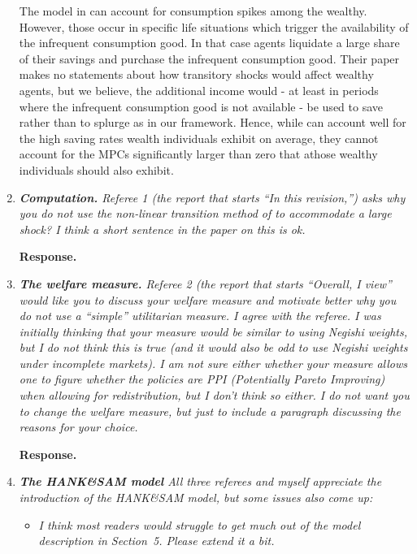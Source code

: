 \documentclass[12pt,letterpaper,english]{article}
\begin{document}
\begin{enumerate}
The model in \citet{melcangi2024stock} can account for consumption spikes among the wealthy. However, those occur in specific life situations which trigger the availability of the infrequent consumption good. In that case agents liquidate a large share of their savings and purchase the infrequent consumption good. Their paper makes no statements about how transitory shocks would affect wealthy agents, but we believe, the additional income would - at least in periods where the infrequent consumption good is not available - be used to save rather than to splurge as in our framework. Hence, while \citet{melcangi2024stock} can account well for the high saving rates wealth individuals exhibit on average, they cannot account for the MPCs significantly larger than zero that athose wealthy individuals should also exhibit.

\item \textit{\textbf{Computation.} Referee 1 (the report that starts ``In this revision,'') asks why you do not use the non-linear transition method of \citet{boppart2018exploiting} to accommodate a large shock? I think a short sentence in the paper on this is ok.}

\noindent \textbf{Response.} 

\item \textit{\textbf{The welfare measure.} Referee 2 (the report that starts ``Overall, I view'' would like you to discuss your welfare measure and motivate better why you do not use a ``simple'' utilitarian measure. I agree with the referee. I was initially thinking that	your measure would be similar to using Negishi weights, but I do not think this is true (and it would also be odd to use Negishi weights under incomplete markets). I am not sure either whether your measure allows one to figure whether the policies are PPI (Potentially Pareto Improving) when allowing for redistribution, but I don't think so either. I do not want you to change the welfare measure, but just to include a paragraph discussing the reasons for your choice.}
	
\noindent \textbf{Response.} 

\item \textit{\textbf{The HANK\&SAM model} All three referees and myself appreciate the introduction of the HANK\&SAM model, but some issues also come up:}
	\begin{itemize}
		\item \textit{I think most readers would struggle to get much out of the model description in Section~5. Please extend it a bit.}
		

\end{itemize}
\end{enumerate}
\end{document}

